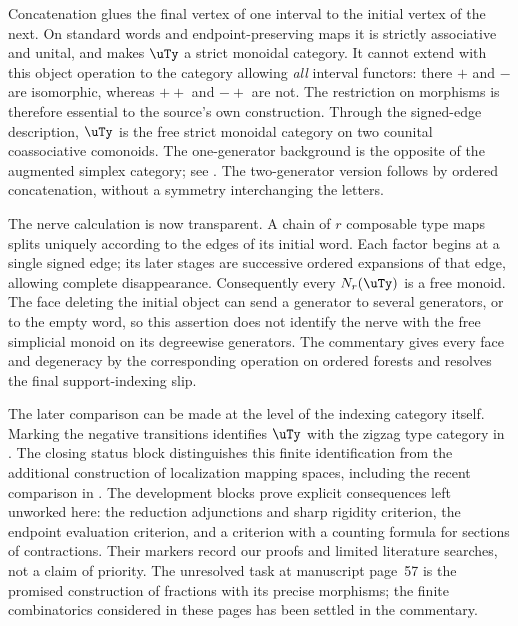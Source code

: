 Concatenation glues the final vertex of one interval to the initial vertex of the next. On standard words and endpoint-preserving maps it is strictly associative and unital, and makes $\uTy$ a strict monoidal category. It cannot extend with this object operation to the category allowing \emph{all} interval functors: there $+$ and $-$ are isomorphic, whereas $++$ and $-+$ are not. The restriction on morphisms is therefore essential to the source's own construction. Through the signed-edge description, $\uTy$ is the free strict monoidal category on two counital coassociative comonoids. The one-generator background is the opposite of the augmented simplex category; see \citet[Appendix~D, Proposition~D.2]{AguiarMahajan2010}. The two-generator version follows by ordered concatenation, without a symmetry interchanging the letters.

The nerve calculation is now transparent. A chain of $r$ composable type maps splits uniquely according to the edges of its initial word. Each factor begins at a single signed edge; its later stages are successive ordered expansions of that edge, allowing complete disappearance. Consequently every $N_r(\uTy)$ is a free monoid. The face deleting the initial object can send a generator to several generators, or to the empty word, so this assertion does not identify the nerve with the free simplicial monoid on its degreewise generators. The commentary gives every face and degeneracy by the corresponding operation on ordered forests and resolves the final support-indexing slip.

The later comparison can be made at the level of the indexing category itself. Marking the negative transitions identifies $\uTy$ with the zigzag type category in \citet[Definition~3.5]{MazelGee2018Hammocks}. The closing status block distinguishes this finite identification from the additional construction of localization mapping spaces, including the recent comparison in \citet[Theorem~1.9 and Corollary~1.11]{ArakawaCnossen2026}. The development blocks prove explicit consequences left unworked here: the reduction adjunctions and sharp rigidity criterion, the endpoint evaluation criterion, and a criterion with a counting formula for sections of contractions. Their markers record our proofs and limited literature searches, not a claim of priority. The unresolved task at manuscript page~57 is the promised construction of fractions with its precise morphisms; the finite combinatorics considered in these pages has been settled in the commentary.
